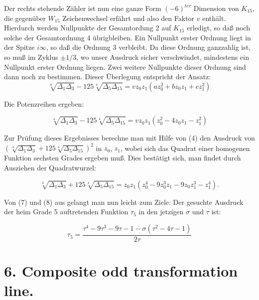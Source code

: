 \documentclass{article}
\begin{document}
Der rechts stehende Zähler ist nun eine ganze Form $(-6)^{ter}$ Dimension von $K_{15}$, die gegenüber $W_{15}$ Zeichenwechsel erfährt und also den Faktor $v$ enthält. Hierdurch werden Nullpunkte der Gesamtordung 2 auf $K_{15}$ erledigt, so daß noch solche der Gesamtordnung 4 übrigbleiben. Ein Nullpunkt erster Ordnung liegt in der Spitze $i\infty$, so daß die Ordnung 3 verbleibt. Da diese Ordnung ganzzahlig ist, so muß im Zyklus $\pm1/3$, wo unser Ausdruck sicher verschwindet, mindestens ein Nullpunkt erster Ordnung liegen. Zwei weitere Nullpunkte dieser Ordnung sind dann noch zu bestimmen. Dieser Überlegung entspricht der Ansatz: 
\[
  \sqrt[4]{\Delta_1\Delta_3}-125\sqrt[4]{\Delta_5\Delta_{15}}=v z_0 z_1(az_0^2+bz_0z_1+cz_1^2)
\]

Die Potenzreihen ergeben:

\begin{equation}
  \sqrt[4]{\Delta_1\Delta_3}-125\sqrt[4]{\Delta_5\Delta_{15}}=v z_0 z_1(z_0^2-4z_0z_1-z_1^2)
\end{equation}

Zur Prüfung dieses Ergebnisses berechne man mit Hilfe von (4) den Ausdruck von $(\sqrt[4]{\Delta_1\Delta_3}+125\sqrt[4]{\Delta_5\Delta_{15}})^2$ in $z_0$, $z_1$, wobei sich das Quadrat einer homogenen Funktion sechsten Grades ergeben muß. Dies bestätigt sich, man findet durch Ausziehen der Quadratwurzel: 

\begin{equation}
  \sqrt[4]{\Delta_1\Delta_3}+125\sqrt[4]{\Delta_5\Delta_{15}}=z_0 z_1(z_0^4-9z_0^3z_1-9z_0z_1^3-z_1^4).
\end{equation}

Von (7) und (8) aus gelangt man nun leicht zum Ziele: Der gesuchte Ausdruck der heim Grade 5 auftretenden Funktion $\tau_5$ in den jetzigen $\sigma$ und $\tau$ ist: 

\begin{equation}
  \tau_5=\frac{\tau^4-9\tau^3-9\tau-1-\sigma(\tau^2-4\tau-1)}{2\tau}
\end{equation}

\section*{6. Composite odd transformation line.}
\end{document}
